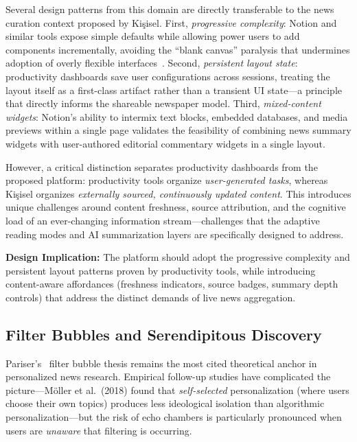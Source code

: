 \documentclass[14pt]{article}
\begin{document}
Several design patterns from this domain are directly transferable to the news curation context proposed by Ki\c{s}isel. First, \emph{progressive complexity}: Notion and similar tools expose simple defaults while allowing power users to add components incrementally, avoiding the ``blank canvas'' paralysis that undermines adoption of overly flexible interfaces~\cite{mackay1991}. Second, \emph{persistent layout state}: productivity dashboards save user configurations across sessions, treating the layout itself as a first-class artifact rather than a transient UI state---a principle that directly informs the shareable newspaper model. Third, \emph{mixed-content widgets}: Notion's ability to intermix text blocks, embedded databases, and media previews within a single page validates the feasibility of combining news summary widgets with user-authored editorial commentary widgets in a single layout.

However, a critical distinction separates productivity dashboards from the proposed platform: productivity tools organize \emph{user-generated tasks}, whereas Ki\c{s}isel organizes \emph{externally sourced, continuously updated content}. This introduces unique challenges around content freshness, source attribution, and the cognitive load of an ever-changing information stream---challenges that the adaptive reading modes and AI summarization layers are specifically designed to address.

\smallskip
\noindent\textbf{Design Implication:} The platform should adopt the progressive complexity and persistent layout patterns proven by productivity tools, while introducing content-aware affordances (freshness indicators, source badges, summary depth controls) that address the distinct demands of live news aggregation.

\subsection{Filter Bubbles and Serendipitous Discovery}

Pariser's~\cite{pariser2011} filter bubble thesis remains the most cited theoretical anchor in personalized news research. Empirical follow-up studies have complicated the picture---M\"{o}ller et al.\ (2018) found that \emph{self-selected} personalization (where users choose their own topics) produces less ideological isolation than algorithmic personalization---but the risk of echo chambers is particularly pronounced when users are \emph{unaware} that filtering is occurring.
\end{document}

